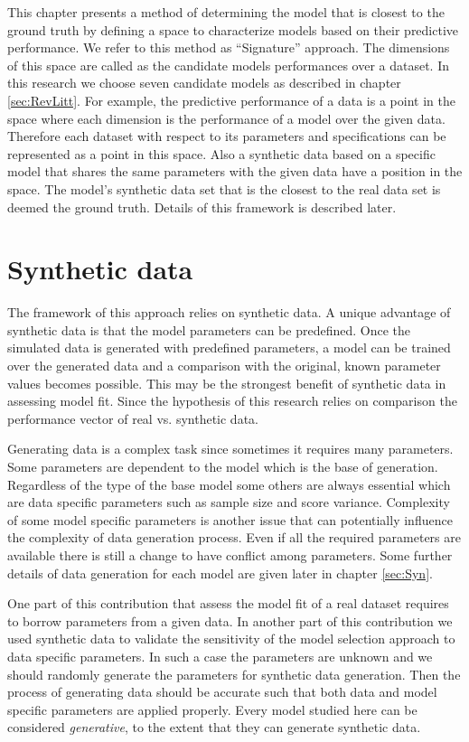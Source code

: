 \label{sec:Approach}

This chapter presents a method of determining the model that is closest to the ground truth by defining a space to characterize models based on their predictive performance. We refer to this method as ``Signature'' approach. The dimensions of this space are called as the candidate models performances over a dataset. In this research we choose seven candidate models as described in chapter \ref{sec:RevLitt}. For example, the predictive performance of a data is a point in the space where each dimension is the performance of a model over the given data. Therefore each dataset with respect to its parameters and specifications can be represented as a point in this space. Also a synthetic data based on a specific model that shares the same parameters with the given data have a position in the space.  The model's synthetic data set that is the closest to the real data set is deemed the ground truth.  Details of this framework is described later. 

\section{Synthetic data}
The framework of this approach relies on synthetic data. A unique advantage of synthetic data is that the model parameters can be predefined. Once the simulated data is generated with predefined parameters, a model can be trained over the generated data and a comparison with the original, known parameter values becomes possible. This may be the strongest benefit of synthetic data in assessing model fit. Since the hypothesis of this research relies on comparison the performance vector of real vs. synthetic data.

Generating data is a complex task since sometimes it requires many parameters. Some parameters are dependent to the model which is the base of generation. Regardless of the type of the base model some others are always essential which are data specific parameters such as sample size and score variance. Complexity of some model specific parameters is another issue that can potentially influence the complexity of data generation process. Even if all the required parameters are available there is still a change to have conflict among parameters. Some further details of data generation for each model are given later in chapter \ref{sec:Syn}. 

One part of this contribution that assess the model fit of a real dataset requires to borrow parameters from a given data. In another part of this contribution we used synthetic data to validate the sensitivity of the model selection approach to data specific parameters. In such a case the parameters are unknown and we should randomly generate the parameters for synthetic data generation. Then the process of generating data should be accurate such that both data  and model specific parameters are applied properly. Every model studied here can be considered \textit{generative}, to the extent that they can generate synthetic data.



